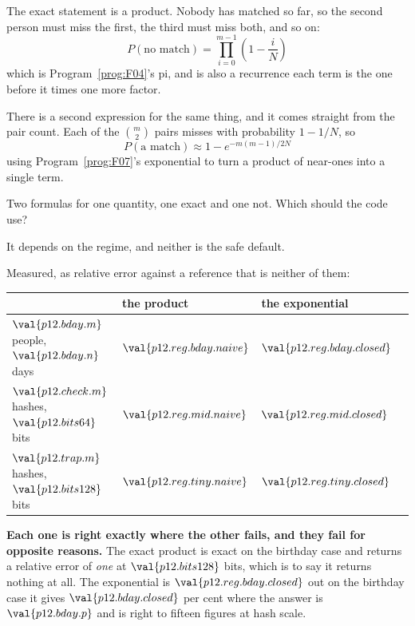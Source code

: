 \begin{fr}
The exact statement is a product. Nobody has matched so far, so the second
person must miss the first, the third must miss both, and so on:
\[ P(\text{no match}) = \prod_{i=0}^{m-1}\left(1 - \frac{i}{N}\right) \]
which is Program~\ref{prog:F04}'s pi, and is also a recurrence \dash{} each
term is the one before it times one more factor.

There is a second expression for the same thing, and it comes straight from
the pair count. Each of the $\binom{m}{2}$ pairs misses with probability
$1 - 1/N$, so
\[ P(\text{a match}) \approx 1 - e^{-m(m-1)/2N} \]
using Program~\ref{prog:F07}'s exponential to turn a product of near-ones into
a single term.

Two formulas for one quantity, one exact and one not. Which should the code
use?
\nextframe
\end{fr}

\begin{fr}
\begin{ansblock}
It depends on the regime, and neither is the safe default.
\end{ansblock}

Measured, as relative error against a reference that is neither of them:

\begin{center}
\begin{tabular}{llll}
\toprule
 & \textbf{the product} & \textbf{the exponential} \\
\midrule
$\val{p12.bday.m}$ people, $\val{p12.bday.n}$ days
  & $\val{p12.reg.bday.naive}$ & $\val{p12.reg.bday.closed}$ \\
$\val{p12.check.m}$ hashes, $\val{p12.bits64}$ bits
  & $\val{p12.reg.mid.naive}$ & $\val{p12.reg.mid.closed}$ \\
$\val{p12.trap.m}$ hashes, $\val{p12.bits128}$ bits
  & $\val{p12.reg.tiny.naive}$ & $\val{p12.reg.tiny.closed}$ \\
\bottomrule
\end{tabular}
\end{center}

\textbf{Each one is right exactly where the other fails, and they fail for
opposite reasons.} The exact product is exact on the birthday case and returns
a relative error of \emph{one} at $\val{p12.bits128}$ bits, which is to say it
returns nothing at all. The exponential is $\val{p12.reg.bday.closed}$ out on
the birthday case \dash{} it gives $\val{p12.bday.closed}$ per cent where the
answer is $\val{p12.bday.p}$ \dash{} and is right to fifteen figures at hash
scale.
\end{fr}

